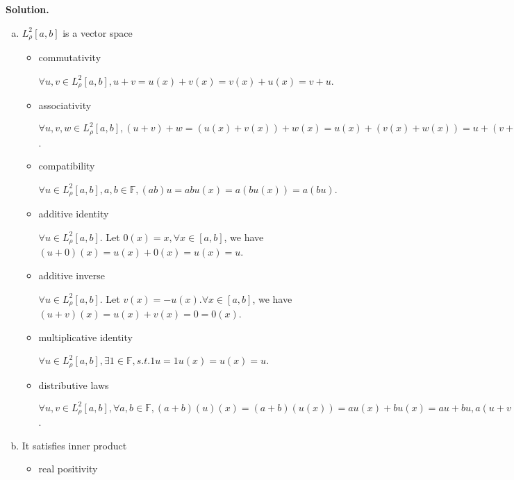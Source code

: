 \documentclass[a4paper]{book}
\newenvironment{solution}%
{\noindent\textbf{Solution.}}%
{\qedhere}
\numberwithin{equation}{chapter}
\theoremstyle{definition}
\begin{document}
\begin{solution}
  \begin{enumerate}[(a)]
  \item $L_{\rho}^2 [a,b]$ is a vector space
    \begin{itemize}
    \item commutativity

      $\forall u,v \in L_\rho^2[a,b], u + v = u(x) + v(x) = v(x) + u(x) = v + u$.

    \item associativity

      $\forall u,v,w \in L_\rho^2 [a,b], (u + v) + w = (u(x) + v(x)) + w(x) = u(x) + (v(x) + w(x)) = u + (v + w)$.

    \item compatibility

      $\forall u \in L_\rho^2[a,b], a,b \in \mathbb{F}, (ab)u = ab u(x) = a(bu(x)) = a(bu)$.

    \item additive identity

      $\forall u \in L_\rho^2[a,b]$. Let $0(x) = x, \forall x \in [a,b]$, we have $(u + 0)(x) = u(x) + 0(x) = u(x) = u$.
      

    \item additive inverse

      $\forall u \in L_\rho^2[a,b]$. Let $v(x) = -u(x). \forall x \in [a,b]$, we have $(u + v)(x) = u(x) + v(x) = 0 = 0(x)$.

    \item multiplicative identity

      $\forall u \in L_\rho^2[a,b], \exists 1 \in \mathbb{F},s.t. 1u = 1 u(x) = u(x) = u$.

    \item distributive laws

      $\forall u,v \in L_\rho^2[a,b], \forall a,b \in \mathbb{F}, (a+b)(u)(x) = (a + b)(u(x)) = au(x) + bu(x) = au + bu, a(u + v)(x) = au(x) + a v(x) = au + av$.

      
    \end{itemize}

  \item It satisfies inner product
    \begin{itemize}
    \item real positivity


\end{itemize}
\end{enumerate}
\end{solution}
\end{document}
